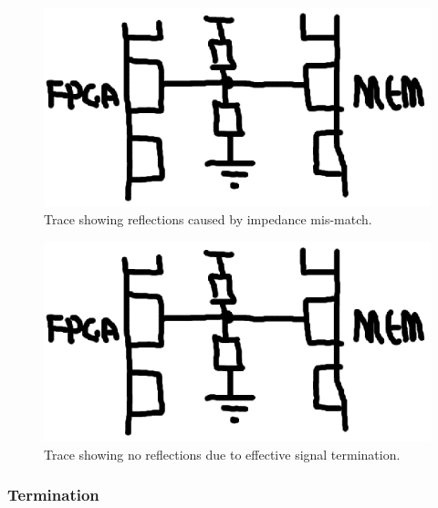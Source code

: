 \begin{figure}
\begin{center}
\includegraphics[width=\linewidth]{images/async_fifo.eps}
\caption[DDR signal showing reflections]{Trace showing reflections caused by
impedance mis-match.}
\end{center}
\end{figure}

\begin{figure}
\begin{center}
\includegraphics[width=\linewidth]{images/async_fifo.eps}
\caption[Terminated DDR signal without reflections]{Trace showing no reflections
due to effective signal termination.}
\end{center}
\end{figure}

\subsubsection{Termination}

